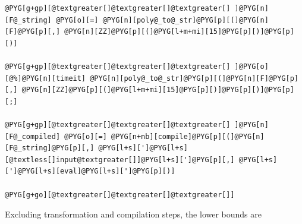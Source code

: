 \begin{Verbatim}[commandchars=@\[\]]
@PYG[g+gp][@textgreater[]@textgreater[]@textgreater[] ]@PYG[n][F@_string] @PYG[o][=] @PYG[n][poly@_to@_str]@PYG[p][(]@PYG[n][F]@PYG[p][,] @PYG[n][ZZ]@PYG[p][(]@PYG[l+m+mi][15]@PYG[p][)]@PYG[p][)]

@PYG[g+gp][@textgreater[]@textgreater[]@textgreater[] ]@PYG[o][@%]@PYG[n][timeit] @PYG[n][poly@_to@_str]@PYG[p][(]@PYG[n][F]@PYG[p][,] @PYG[n][ZZ]@PYG[p][(]@PYG[l+m+mi][15]@PYG[p][)]@PYG[p][)]@PYG[p][;]

@PYG[g+gp][@textgreater[]@textgreater[]@textgreater[] ]@PYG[n][F@_compiled] @PYG[o][=] @PYG[n+nb][compile]@PYG[p][(]@PYG[n][F@_string]@PYG[p][,] @PYG[l+s][']@PYG[l+s][@textless[]input@textgreater[]]@PYG[l+s][']@PYG[p][,] @PYG[l+s][']@PYG[l+s][eval]@PYG[l+s][']@PYG[p][)]

@PYG[g+go][@textgreater[]@textgreater[]@textgreater[]]
\end{Verbatim}
\noindent
Excluding transformation and compilation steps, the lower bounds are

